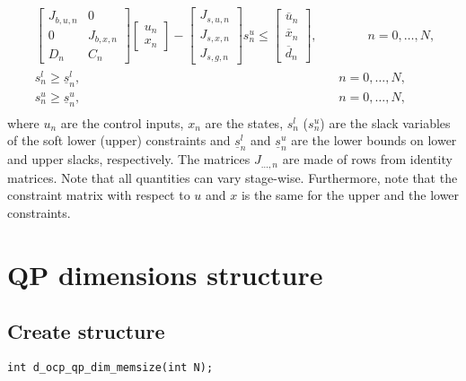 \documentclass[a4paper]{report}
\begin{document}
\begin{align*}
& \quad \begin{bmatrix} J_{b,u,n} & 0 \\ 0 & J_{b,x,n} \\ D_n & C_n \end{bmatrix} \begin{bmatrix} u_n \\ x_n \end{bmatrix} - \begin{bmatrix} J_{s,u,n} \\ J_{s,x,n} \\ J_{s,g,n} \end{bmatrix} s^u_n \leq \begin{bmatrix} \overline u_n \\ \overline x_n \\ \overline d_n \end{bmatrix} , \qquad \qquad n=0,\dots,N, & & \\
& \quad s^l_n\geq \underline{s}^l_n, \qquad \qquad \qquad \qquad \qquad \qquad \qquad \qquad \qquad \qquad \,\,\,  n=0,\dots,N, & &\\
& \quad s^u_n\geq \underline{s}^u_n, \qquad \qquad \qquad \qquad \qquad \qquad \qquad \qquad \qquad \qquad \,\,\,  n=0,\dots,N, & &\\
\end{align*}
where $u_n$ are the control inputs, $x_n$ are the states, $s^l_n$ ($s^u_n$) are the slack variables of the soft lower (upper) constraints
and $\underline{s}^l_n$ and $\underline{s}^u_n$ are the lower bounds on lower and upper slacks, respectively.
The matrices $J_{\dots,n}$ are made of rows from identity matrices.
Note that all quantities can vary stage-wise.
Furthermore, note that the constraint matrix with respect to $u$ and $x$ is the same for the upper and the lower constraints.

\section{QP dimensions structure}

\subsection{Create structure}

\begin{verbatim}
int d_ocp_qp_dim_memsize(int N);
\end{verbatim}
\end{document}
